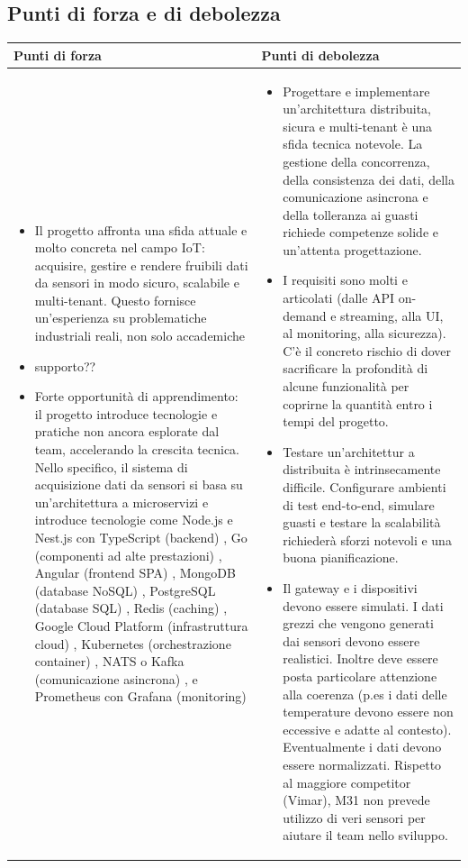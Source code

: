 \documentclass[a4paper,11pt]{article}
\begin{document}
\subsection{Punti di forza e di debolezza}
{\footnotesize
\begin{tabularx}{\textwidth}{|X|X|}
\hline
\rowcolor{lightgray!40} %
\textbf{Punti di forza} & \textbf{Punti di debolezza} \\
\hline
\begin{itemize}
\item  Il progetto affronta una sfida attuale e molto concreta nel campo IoT: acquisire, gestire e rendere fruibili dati da sensori in modo sicuro, scalabile e multi-tenant. Questo fornisce un'esperienza su problematiche industriali reali, non solo accademiche
\item supporto??
\item Forte opportunità di apprendimento: il progetto introduce tecnologie e pratiche non ancora esplorate dal team, accelerando la crescita tecnica. Nello specifico, il sistema di acquisizione dati da sensori si basa su un'architettura a microservizi e introduce tecnologie come Node.js e Nest.js con TypeScript (backend) , Go (componenti ad alte prestazioni) , Angular (frontend SPA) , MongoDB (database NoSQL) , PostgreSQL (database SQL) , Redis (caching) , Google Cloud Platform (infrastruttura cloud) , Kubernetes (orchestrazione container) , NATS o Kafka (comunicazione asincrona) , e Prometheus con Grafana (monitoring)
\end{itemize}
 & \begin{itemize}
\item Progettare e implementare un'architettura distribuita, sicura e multi-tenant è una sfida tecnica notevole. La gestione della concorrenza, della consistenza dei dati, della comunicazione asincrona e della tolleranza ai guasti richiede competenze solide e un'attenta progettazione.
\item 	I requisiti sono molti e articolati (dalle API on-demand e streaming, alla UI, al monitoring, alla sicurezza). C'è il concreto rischio di dover sacrificare la profondità di alcune funzionalità per coprirne la quantità entro i tempi del progetto.
\item Testare un'architettur a distribuita è intrinsecamente difficile. Configurare ambienti di test end-to-end, simulare guasti e testare la scalabilità richiederà sforzi notevoli e una buona pianificazione.
\item  Il gateway e i dispositivi devono essere simulati. I dati grezzi che vengono generati dai sensori devono essere realistici. Inoltre deve essere posta particolare attenzione alla coerenza (p.es i dati delle temperature devono essere non eccessive e adatte al contesto). Eventualmente i dati devono essere normalizzati. Rispetto al maggiore competitor (Vimar), M31 non prevede utilizzo di veri sensori per aiutare il team nello sviluppo.
\end{itemize} \\
\hline
\end{tabularx}
}
\end{document}
